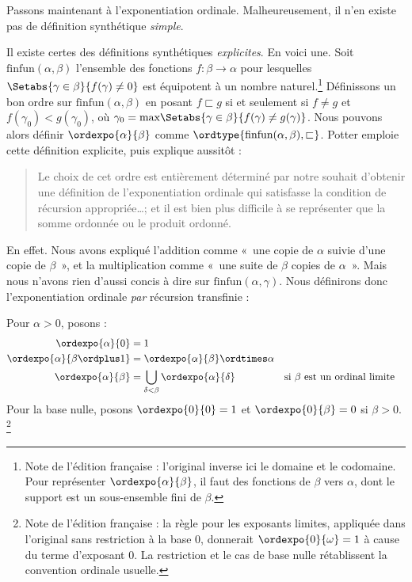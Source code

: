 \documentclass[../../../include/open-logic-section]{subfiles}
\begin{document}

Passons maintenant à l'exponentiation ordinale.
Malheureusement, il n'en existe pas de définition
synthétique \emph{simple}.

Il existe certes des définitions synthétiques
\emph{explicites}. En voici une. Soit
$\text{finfun}(\alpha,\beta)$ l'ensemble des
fonctions $f \colon \beta \to \alpha$
pour lesquelles
$\Setabs{\gamma \in \beta}{f(\gamma) \neq 0}$
est équipotent à un nombre naturel.\footnote{Note
de l'édition française : l'original inverse ici
le domaine et le codomaine. Pour représenter
$\ordexpo{\alpha}{\beta}$, il faut des fonctions
de $\beta$ vers $\alpha$, dont le support est
un sous-ensemble fini de $\beta$.}
Définissons un bon ordre sur
$\text{finfun}(\alpha,\beta)$ en posant
$f \sqsubset g$ si et seulement si
$f \neq g$ et
$f(\gamma_0) < g(\gamma_0)$, où
$\gamma_0 =
\text{max}\Setabs{\gamma \in \beta}
{f(\gamma) \neq g(\gamma)}$.
Nous pouvons alors définir
$\ordexpo{\alpha}{\beta}$ comme
$\ordtype{\text{finfun}(\alpha, \beta),
\sqsubset}$. Potter emploie cette définition
explicite, puis explique aussitôt :
\begin{quote}
	Le choix de cet ordre est entièrement déterminé
	par notre souhait d'obtenir une définition de
	l'exponentiation ordinale qui satisfasse la
	condition de récursion appropriée\ldots ;
	et il est bien plus difficile à se représenter
	que la somme ordonnée ou le produit ordonné.
	\citep[p.~199]{Potter2004}
\end{quote}
En effet. Nous avons expliqué l'addition comme
«~une copie de $\alpha$ suivie d'une copie de
$\beta$~», et la multiplication comme
«~une suite de $\beta$ copies de $\alpha$~».
Mais nous n'avons rien d'aussi concis à dire sur
$\text{finfun}(\alpha, \gamma)$. Nous définirons
donc l'exponentiation ordinale \emph{par}
récursion transfinie :

\begin{defn}
Pour $\alpha>0$, posons :
\begin{align*}
	\ordexpo{\alpha}{0} &= 1\\
	\ordexpo{\alpha}{\beta\ordplus 1}
	&= \ordexpo{\alpha}{\beta} \ordtimes \alpha\\
	\ordexpo{\alpha}{\beta}
	&= \bigcup_{\delta < \beta}
	\ordexpo{\alpha}{\delta}
	&& \text{si $\beta$ est un ordinal limite}
\end{align*}
Pour la base nulle, posons
$\ordexpo{0}{0}=1$ et
$\ordexpo{0}{\beta}=0$ si $\beta>0$.
\footnote{Note de l'édition française : la règle
pour les exposants limites, appliquée dans
l'original sans restriction à la base $0$,
donnerait $\ordexpo{0}{\omega}=1$ à cause du
terme d'exposant $0$. La restriction et le cas
de base nulle rétablissent la convention
ordinale usuelle.}
\end{defn}
\end{document}
